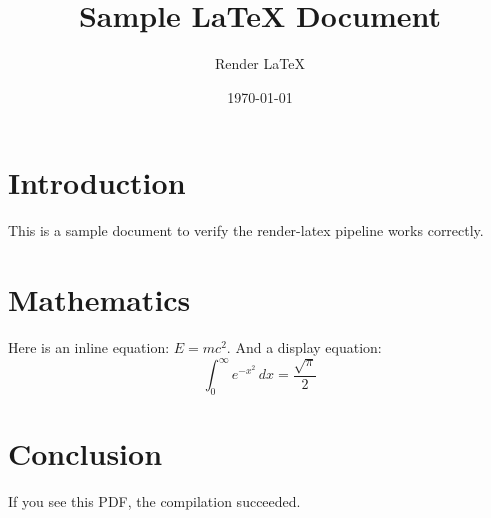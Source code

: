 \documentclass[11pt]{article}
\title{Sample LaTeX Document}
\author{Render LaTeX}
\date{\today}
\begin{document}
\maketitle

\section{Introduction}
This is a sample document to verify the render-latex pipeline works correctly.

\section{Mathematics}
Here is an inline equation: $E = mc^2$. And a display equation:
\[
\int_0^\infty e^{-x^2} \, dx = \frac{\sqrt{\pi}}{2}
\]

\section{Conclusion}
If you see this PDF, the compilation succeeded.
\end{document}
